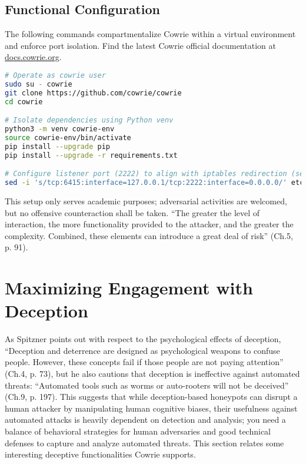 \documentclass{cls/ULBreport}
\begin{document}
    \subsection{Functional Configuration}
    The following commands compartmentalize Cowrie within a virtual environment and enforce port isolation. Find the latest Cowrie official documentation at \href{https://docs.cowrie.org/en/latest/INSTALL.html}{docs.cowrie.org}.
    \begin{lstlisting}[language=bash,caption={Cowrie Honeypot Setup}]
# Operate as cowrie user
sudo su - cowrie  
git clone https://github.com/cowrie/cowrie  
cd cowrie  

# Isolate dependencies using Python venv
python3 -m venv cowrie-env  
source cowrie-env/bin/activate  
pip install --upgrade pip
pip install --upgrade -r requirements.txt  

# Configure listener port (2222) to align with iptables redirection (section 2.3)
sed -i 's/tcp:6415:interface=127.0.0.1/tcp:2222:interface=0.0.0.0/' etc/cowrie.cfg  
    \end{lstlisting}



    \begin{tcolorbox}[  
        colback=red!5!white,  
        colframe=red!75!black,  
        title={\textbf{\textcolor{black}{Security Disclaimer}}},
        fontupper=\small,  
        sharp corners  
    ]  
    This setup only serves academic purposes; adversarial activities are welcomed, but no offensive counteraction shall be taken. \enquote{The greater the level of interaction, the more functionality provided to the attacker, and the greater the complexity. Combined, these elements can introduce a great deal of risk} (Ch.5, p. 91).
    \end{tcolorbox}  
    


    \section{Maximizing Engagement with Deception}

As Spitzner points out with respect to the psychological effects of deception, \enquote{Deception and deterrence are designed as psychological weapons to confuse
people. However, these concepts fail if those people are not paying attention} (Ch.4, p. 73), but he also cautions that deception is ineffective against automated threats: \enquote{Automated tools such as worms or auto-rooters will not be deceived} (Ch.9, p. 197). This suggests that while deception-based honeypots can disrupt a human attacker by manipulating human cognitive biases, their usefulness against automated attacks is heavily dependent on detection and analysis; you need a balance of behavioral strategies for human adversaries and good technical defenses to capture and analyze automated threats. This section relates some interesting deceptive functionalities Cowrie supports.
\end{document}
